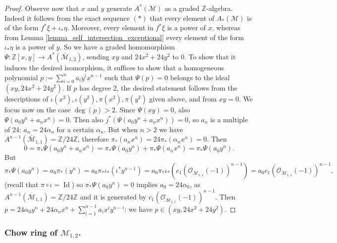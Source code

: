 \documentclass[11pt]{amsart}
\theoremstyle{definition}
\theoremstyle{remark}
\newcommand{\calO}{\mathcal O}
\newcommand{\calM}{\mathcal M}
\begin{document}
\begin{proof}
Observe now that $x$ and $y$ generate $A^*(\calM)$ as a graded $\mathbb{Z}$-algebra. Indeed it follows from the exact sequence $(\ast)$ that every element of $A_*(\calM)$ is of the form $f^*\xi + \iota_*\eta$. Moreover, every element in $f^*\xi$ is a power of $x$, whereas from Lemma \ref{lemma_self_intersection_exceptional} every element of the form $\iota_*\eta$ is a power of $y$. So we have a graded homomorphism $\Psi:\mathbb{Z}[x,y]\to A^*(\overline{\calM}_{1,2})$, sending $xy$ and $24x^2 + 24y^2$ to 0. To show that it induces the desired isomorphism, it suffices to show that
a homogeneous polynomial $p:=\sum_{i=0}^na_iy^ix^{n-1}$ such that $\Psi(p)=0$ belongs to the ideal $(xy,24x^2 + 24y^2)$. If $p$ has degree 2, the desired statement follows from the descriptions of $\iota(x^2),\iota(y^2), \pi(x^2), \pi(y^2)$ given above, and from $xy=0$. We focus now on the case $\operatorname{deg}(p)>2$.
Since $\Psi(xy)=0$, also $\Psi(a_0y^n + a_n x^n)=0$. Then also $j^*(\Psi(a_0y^n + a_n x^n)) = 0$, so $a_n$ is a multiple of 24: $a_n = 24\alpha_n$ for a certain $\alpha_n$. But when $n>2$ we have $A^{n-1}(\overline{\calM}_{1,1}) = \mathbb{Z}/24\mathbb{Z}$, therefore $\pi_*(a_nx^n) = 24\pi_*(\alpha_nx^n) = 0$. Then
$$0=\pi_* \Psi(a_0y^n + a_n x^n)=\pi_* \Psi(a_0y^n )+\pi_*\Psi( a_n x^n) = \pi_*\Psi( a_0 y^n).$$
But $\pi_*\Psi(a_0y^n) =a_0 \pi_*(y^{n}) = a_0\pi_* \iota_*(\iota^* y^{n-1}) =a_0\pi_* \iota_*(  c_1(\calO_{\overline{\calM}_{1,1}}(-1))^{n-1}) = a_0 c_1(\calO_{\overline{\calM}_{1,1}}(-1))^{n-1},$ (recall that $\pi\circ \iota = \operatorname{Id}$) so $\pi_*\Psi(a_0y^n)=0 $ implies $a_0 = 24\alpha_0$, as $A^{n-1}(\overline{\calM}_{1,1}) = \mathbb{Z}/24\mathbb{Z}$ and it is generated by $c_1(\calO_{\overline{\calM}_{1,1}}(-1))^{n-1}$.
Then $p = 24\alpha_0y^n + 24\alpha_nx^n + \sum_{i=1}^{n-1}a_ix^iy^{n-i}$: we have $p \in (xy,24x^2+24y^2)$.
\end{proof}

\subsubsection{Chow ring of $\calM_{1,2}$.}
\end{document}
